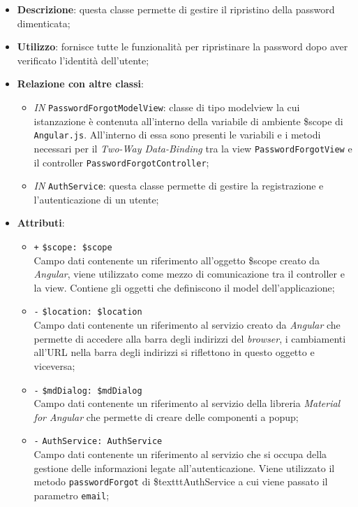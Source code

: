\begin{itemize}
	\item \textbf{Descrizione}: questa classe permette di gestire il ripristino della password dimenticata;
	\item \textbf{Utilizzo}: fornisce tutte le funzionalità per ripristinare la password dopo aver verificato l'identità dell'utente;
	\item \textbf{Relazione con altre classi}:
	\begin{itemize}
		\item \textit{IN} \texttt{PasswordForgotModelView}: classe di tipo modelview la cui istanzazione è contenuta all'interno della variabile di ambiente \$scope di \texttt{Angular.js}. All'interno di essa sono presenti le variabili e i metodi necessari per il \textit{Two-Way Data-Binding} tra la view \texttt{PasswordForgotView} e il controller \texttt{PasswordForgotController};
		\item \textit{IN} \texttt{AuthService}: questa classe permette di gestire la registrazione e l'autenticazione di un utente;
	\end{itemize}
	\item \textbf{Attributi}:
	\begin{itemize}
		\item \texttt{+} \texttt{\$scope: \$scope} \\
		Campo dati contenente un riferimento all’oggetto \$scope creato da \textit{Angular}, viene utilizzato come mezzo di comunicazione tra il controller e la view. Contiene gli oggetti che definiscono il model dell’applicazione;
		\item \texttt{-} \texttt{\$location: \$location} \\
		Campo dati contenente un riferimento al servizio creato da \textit{Angular} che permette di accedere alla barra degli indirizzi del \textit{browser}, i cambiamenti all’URL nella barra degli indirizzi si riflettono in questo oggetto e viceversa;
		\item \texttt{-} \texttt{\$mdDialog: \$mdDialog} \\
		Campo dati contenente un riferimento al servizio della libreria \textit{Material for Angular} che permette di creare delle componenti a popup;
		\item \texttt{-} \texttt{AuthService: AuthService} \\
		Campo dati contenente un riferimento al servizio che si occupa della gestione delle informazioni legate all’autenticazione. Viene utilizzato il metodo \texttt{passwordForgot} di \$texttt{AuthService} a cui viene passato il parametro \texttt{email};

\end{itemize}
\end{itemize}
